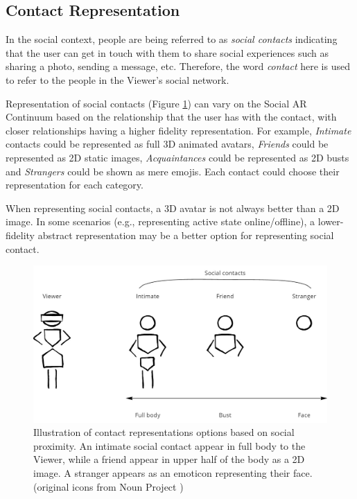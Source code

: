 \pagebreak
\subsection{Contact Representation}

In the social context, people are being referred to as \textit{social contacts} indicating that the user can get in touch with them to share social experiences such as sharing a photo, sending a message, etc. Therefore, the word \textit{contact} here is used to refer to the people in the Viewer's social network. 

Representation of social contacts (Figure \ref{fig:continuum:contact-representations}) can vary on the Social AR Continuum based on the relationship that the user has with the contact, with closer relationships having a higher fidelity representation. For example, \textit{Intimate} contacts could be represented as full 3D animated avatars, \textit{Friends} could be represented as 2D static images, \textit{Acquaintances} could be represented as 2D busts and \textit{Strangers} could be shown as mere emojis. Each contact could choose their representation for each category.

When representing social contacts, a 3D avatar is not always better than a 2D image. In some scenarios (e.g., representing active state online/offline), a lower-fidelity abstract representation may be a better option for representing social contact. 

\begin{figure}[ht]
    \centering
    \includegraphics[width=0.8\linewidth]{images/30-continuum/Continuum-representation.jpg}
    \caption{Illustration of contact representations options based on social proximity. An intimate social contact appear in full body to the Viewer, while a friend appear in upper half of the body as a 2D image. A stranger appears as an emoticon representing their face. (original icons from Noun Project \cite{TheNounProjectInc.})}
    \label{fig:continuum:contact-representations}
\end{figure}


